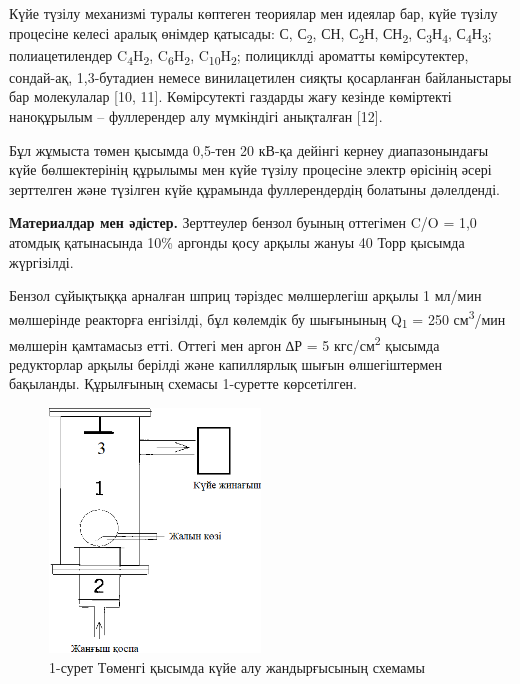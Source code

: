\begin{multicols}{2}
Күйе түзілу механизмі туралы көптеген теориялар мен идеялар бар, күйе
түзілу процесіне келесі аралық өнімдер қатысады: С, С\textsubscript{2},
СН, С\textsubscript{2}Н, СН\textsubscript{2},
С\textsubscript{3}Н\textsubscript{4},
С\textsubscript{4}Н\textsubscript{3}; полиацетилендер
C\textsubscript{4}H\textsubscript{2},
C\textsubscript{6}H\textsubscript{2},
C\textsubscript{10}H\textsubscript{2}; полициклді ароматты
көмірсутектер, сондай-ақ, 1,3-бутадиен немесе винилацетилен сияқты
қосарланған байланыстары бар молекулалар {[}10, 11{]}. Көмірсутекті
газдарды жағу кезінде көміртекті наноқұрылым -- фуллерендер алу
мүмкіндігі анықталған {[}12{]}.

Бұл жұмыста төмен қысымда 0,5-тен 20 кВ-қа дейінгі кернеу диапазонындағы
күйе бөлшектерінің құрылымы мен күйе түзілу процесіне электр өрісінің
әсері зерттелген және түзілген күйе құрамында фуллерендердің болатыны
дәлелденді.

{\bfseries Материалдар мен әдістер.} Зерттеулер бензол буының оттегімен C/O
= 1,0 атомдық қатынасында 10\% аргонды қосу арқылы жануы 40 Торр қысымда
жүргізілді.

Бензол сұйықтыққа арналған шприц тәріздес мөлшерлегіш арқылы 1 мл/мин
мөлшерінде реакторға енгізілді, бұл көлемдік бу шығынының
Q\textsubscript{1} = 250 см\textsuperscript{3}/мин мөлшерін қамтамасыз
етті. Оттегі мен аргон ∆Р = 5 кгс/см\textsuperscript{2} қысымда
редукторлар арқылы берілді және капиллярлық шығын өлшегіштермен
бақыланды. Құрылғының схемасы 1-суретте көрсетілген.
\end{multicols}

\begin{figure}[H]
	\centering
	\includegraphics[width=0.5\textwidth]{assets/23}
	\caption*{1-сурет Төменгі қысымда күйе алу жандырғысының схемамы}
\end{figure}


